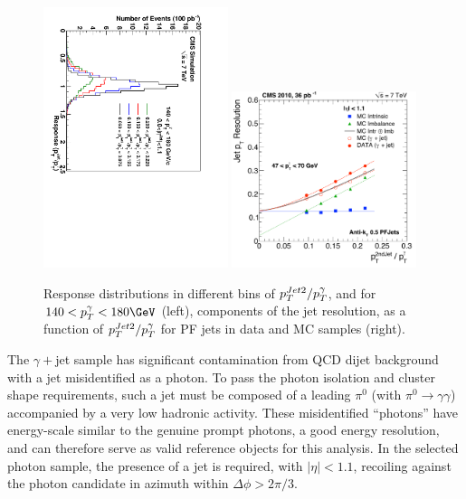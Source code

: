 \begin{figure}[htbp]
\begin{center}
\includegraphics[angle=90,width=0.48\textwidth]{Figures/JER/figs/res_photon/c_MeasRecJetRecPhot_ptBin7_etaBin1.pdf}
\includegraphics[width=0.48\textwidth]{Figures/JER/figs/res_photon/resolutionL2L3_eta011_ptBin_47_70_RecoRelRaw.pdf}
\end{center}
\caption[]{Response distributions in different bins of $p_{{T}}^{Jet2}/p_{{T}}^{\gamma}$, and for $140<\pt^{\gamma}<180\GeV$ (left), components of the jet \pt resolution, as a function of $p_{{T}}^{Jet2}/p_{{T}}^{\gamma}$ for PF jets in data and MC samples (right).}
\label{fig:GenPtRecPhotRes}
\end{figure}

The $\gamma+$jet sample has significant contamination from QCD dijet background with a jet misidentified as a photon. To pass the photon isolation and cluster shape requirements, such a jet must be composed of a leading $\pi^0$ (with $\pi^0 \to\gamma\gamma$) accompanied by a very low hadronic activity. These misidentified ``photons'' have energy-scale similar to the genuine prompt photons, a good energy resolution, and can therefore serve as valid reference objects for this analysis. In the selected photon sample, the presence of a jet is required, with $|\eta|<1.1$, recoiling against the photon candidate in azimuth within $\Delta \phi > 2\pi/3$. 

